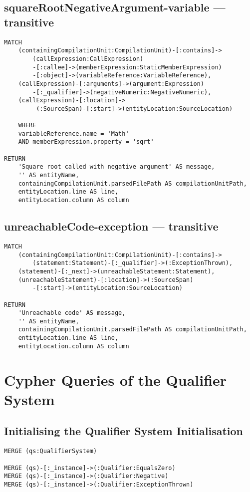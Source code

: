 \newpage
\subsection{squareRootNegativeArgument-variable — transitive}
\begin{lstlisting}[language=Cypher]
MATCH
    (containingCompilationUnit:CompilationUnit)-[:contains]->
        (callExpression:CallExpression)
        -[:callee]->(memberExpression:StaticMemberExpression)
        -[:object]->(variableReference:VariableReference),
    (callExpression)-[:arguments]->(argument:Expression)
        -[:_qualifier]->(negativeNumeric:NegativeNumeric),
    (callExpression)-[:location]->
         (:SourceSpan)-[:start]->(entityLocation:SourceLocation)

    WHERE
    variableReference.name = 'Math'
    AND memberExpression.property = 'sqrt'

RETURN
    'Square root called with negative argument' AS message,
    '' AS entityName,
    containingCompilationUnit.parsedFilePath AS compilationUnitPath,
    entityLocation.line AS line,
    entityLocation.column AS column
\end{lstlisting}


\newpage
\subsection{unreachableCode-exception — transitive}
\begin{lstlisting}[language=Cypher]
MATCH
    (containingCompilationUnit:CompilationUnit)-[:contains]->
        (statement:Statement)-[:_qualifier]->(:ExceptionThrown),
    (statement)-[:_next]->(unreachableStatement:Statement),
    (unreachableStatement)-[:location]->(:SourceSpan)
        -[:start]->(entityLocation:SourceLocation)

RETURN
    'Unreachable code' AS message,
    '' AS entityName,
    containingCompilationUnit.parsedFilePath AS compilationUnitPath,
    entityLocation.line AS line,
    entityLocation.column AS column
\end{lstlisting}


\newpage
\section{Cypher Queries of the Qualifier System}

\subsection{Initialising the Qualifier System Initialisation}
\begin{lstlisting}[language=Cypher]
MERGE (qs:QualifierSystem)

MERGE (qs)-[:_instance]->(:Qualifier:EqualsZero)
MERGE (qs)-[:_instance]->(:Qualifier:Negative)
MERGE (qs)-[:_instance]->(:Qualifier:ExceptionThrown)
\end{lstlisting}


